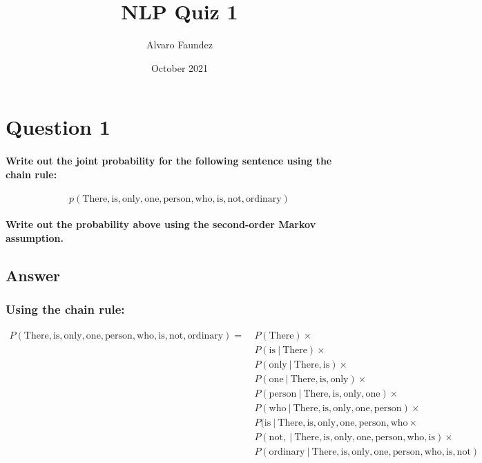 \documentclass{article}
\title{NLP Quiz 1}
\author{Alvaro Faundez}
\date{October 2021}
\newcommand\given[1][]{\:#1\vert\:}
\begin{document}
\maketitle

\section*{Question 1}

\paragraph{Write out the joint probability for the following sentence using the chain rule:}

\begin{equation*}
    p(\text{There}, \text{is}, \text{only}, \text{one}, \text{person}, \text{who}, \text{is}, \text{not}, \text{ordinary})
\end{equation*}

\paragraph{Write out the probability above using the second-order Markov assumption.}

\subsection*{Answer}

\subsubsection*{Using the chain rule:}

\begin{equation*}
    \begin{split}
    P(\text{There}, \text{is}, \text{only}, \text{one}, \text{person}, \text{who}, \text{is}, \text{not}, \text{ordinary}) =\ & P(\text{There}) \times \\
    & P(\text{is} \given \text{There}) \times \\
    & P(\text{only} \given \text{There}, \text{is} ) \times \\
    & P(\text{one} \given \text{There}, \text{is}, \text{only}) \times \\
    & P(\text{person} \given \text{There}, \text{is}, \text{only}, \text{one}) \times \\
    & P(\text{who} \given \text{There}, \text{is}, \text{only}, \text{one}, \text{person}) \times \\
    & P(\text{is} \given \text{There}, \text{is}, \text{only}, \text{one}, \text{person}, \text{who} \times \\
    & P(\text{not}, \given \text{There}, \text{is}, \text{only}, \text{one}, \text{person}, \text{who}, \text{is}) \times \\
    & P(\text{ordinary} \given \text{There}, \text{is}, \text{only}, \text{one}, \text{person}, \text{who}, \text{is}, \text{not})
    \end{split}
\end{equation*}
\end{document}
